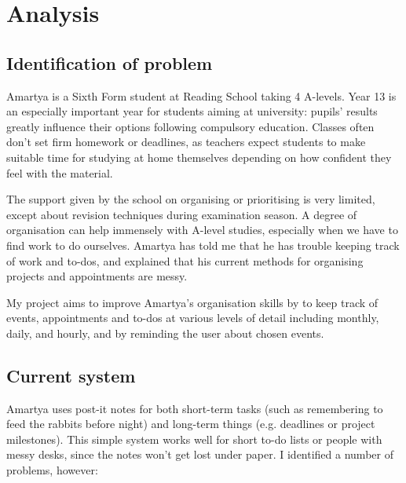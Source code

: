 \section{Analysis}

\subsection{Identification of problem}

Amartya is a Sixth Form student at Reading School taking 4 A-levels.
Year 13 is an especially important year for students aiming at university:
pupils' results greatly influence their options following compulsory
education. Classes often don't set firm homework or deadlines, as teachers
expect students to make suitable time for studying at home themselves depending
on how confident they feel with the material.

The support given by the school on organising or prioritising is very limited,
except about revision techniques during examination season. A degree of
organisation can help immensely with A-level studies, especially when we have to
find work to do ourselves. Amartya has told me that he has trouble keeping track
of work and to-dos, and explained that his current methods for organising
projects and appointments are messy.

My project aims to improve Amartya's organisation skills by  to keep track of events, appointments and
to-dos at various levels of detail including monthly, daily, and hourly, and by
reminding the user about chosen events.


\subsection{Current system}

Amartya uses post-it notes for both short-term tasks (such as remembering to
feed the rabbits before night) and long-term things (e.g. deadlines or project
milestones). This simple system works well for short to-do lists or people with
messy desks, since the notes won't get lost under paper. I identified a number
of problems, however:

